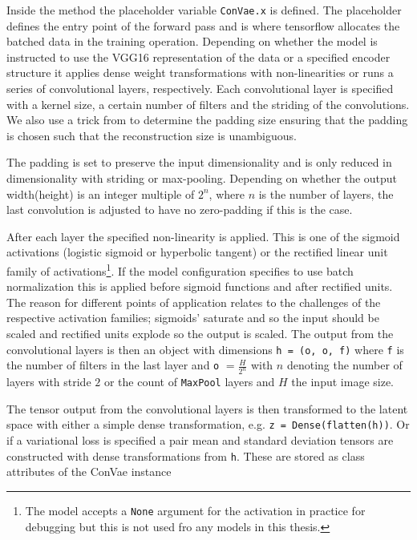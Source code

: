 Inside the method the placeholder variable \lstinline{ConVae.x} is defined. The placeholder defines the entry point of the forward pass and is where tensorflow allocates the batched data in the training operation. Depending on whether the model is instructed to use the VGG16 representation of the data or a specified encoder structure it applies dense weight transformations with non-linearities or runs a series of convolutional layers, respectively. Each convolutional layer is specified with a kernel size, a certain number of filters and the striding of the convolutions. We also use a trick from \citet{Guo2017} to determine the padding size ensuring that the padding is chosen such that the reconstruction size is unambiguous. 

The padding is set to preserve the input dimensionality and is only reduced in dimensionality with striding or max-pooling. Depending on whether the output width(height) is an integer multiple of $2^n$, where $n$ is the number of layers, the last convolution is adjusted to have no zero-padding if this is the case. 

After each layer the specified non-linearity is applied. This is one of the sigmoid activations (logistic sigmoid or hyperbolic tangent) or the rectified linear unit family of activations\footnote{The model accepts a \lstinline{None} argument for the activation in practice for debugging but this is not used fro any models in this thesis.}. If the model configuration specifies to use batch normalization this is applied before sigmoid functions and after rectified units. The reason for different points of application relates to the challenges of the respective activation families; sigmoids' saturate and so the input should be scaled and rectified units explode so the output is scaled. The output from the convolutional layers is then an object with dimensions \lstinline{h = (o, o, f)} where \lstinline{f} is the number of filters in the last layer and \lstinline{o} $= \frac{H}{2^n}$ with $n$ denoting the number of layers with stride $2$ or the count of \lstinline{MaxPool} layers and $H$ the input image size.

The tensor output from the convolutional layers is then transformed to the latent space with either a simple dense transformation, e.g. \lstinline{z = Dense(flatten(h))}. Or if a variational loss is specified a pair mean and standard deviation tensors are constructed with dense transformations from \lstinline{h}. These are stored as class attributes of the ConVae instance

